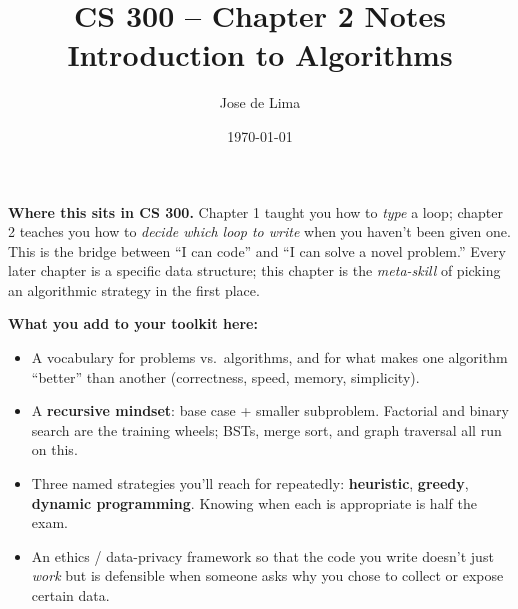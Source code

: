 \documentclass[11pt]{article}
\title{CS 300 -- Chapter 2 Notes\\\large Introduction to Algorithms}
\author{Jose de Lima}
\date{\today}
\begin{document}
\maketitle

\begin{ideabox}
\textbf{Where this sits in CS 300.} Chapter 1 taught you how to \emph{type}
a loop; chapter 2 teaches you how to \emph{decide which loop to write} when
you haven't been given one. This is the bridge between ``I can code'' and
``I can solve a novel problem.'' Every later chapter is a specific data
structure; this chapter is the \emph{meta-skill} of picking an algorithmic
strategy in the first place.

\textbf{What you add to your toolkit here:}
\begin{itemize}
    \item A vocabulary for problems vs.\ algorithms, and for what makes
          one algorithm ``better'' than another (correctness, speed,
          memory, simplicity).
    \item A \textbf{recursive mindset}: base case + smaller subproblem.
          Factorial and binary search are the training wheels; BSTs,
          merge sort, and graph traversal all run on this.
    \item Three named strategies you'll reach for repeatedly:
          \textbf{heuristic}, \textbf{greedy}, \textbf{dynamic programming}.
          Knowing when each is appropriate is half the exam.
    \item An ethics / data-privacy framework so that the code you write
          doesn't just \emph{work} but is defensible when someone asks
          why you chose to collect or expose certain data.
\end{itemize}


\end{ideabox}
\end{document}
